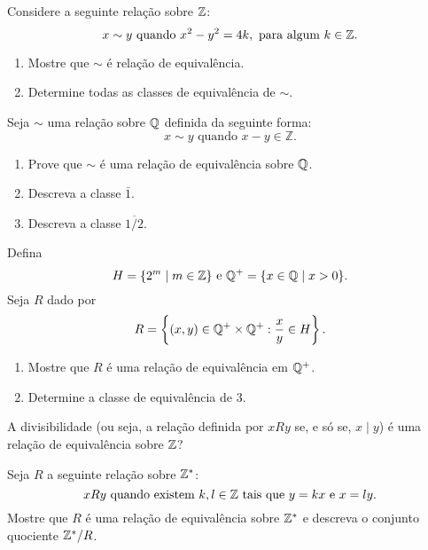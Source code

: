 \documentclass[12pt]{exam}
\begin{document}
\vspace{.3cm}

\questao Considere a seguinte rela\c{c}\~ao sobre $\mathbb{Z}$:
\[
    x \sim y \mbox{ quando }  x^2 - y^2 = 4k, \mbox{ para algum } k \in \mathbb{Z}.
\]
\begin{enumerate}[label={\alph*})]
    \item Mostre que $\sim$ {\'e} rela{\c c}{\~a}o de equival{\^e}ncia.
    \item Determine todas as classes de equival\^encia de $\sim$.
\end{enumerate}
\vspace{.3cm}

\questao Seja $\sim$ uma rela{\c c}{\~a}o sobre $\mathbb{Q}$ definida da seguinte forma:
\[
    x \sim y \mbox{ quando } x - y \in \mathbb{Z}.
\]
\begin{enumerate}[label={\alph*})]
    \item Prove que $\sim$ {\'e} uma rela{\c c}{\~a}o de equival{\^e}ncia sobre $\mathbb{Q}$.
    \item Descreva a classe $\bar{1}$.
    \item Descreva a classe $\overline{1/2}$.
\end{enumerate}

\vspace{.3cm}

\questao Defina
\[
    H = \{2^m \mid m \in \mathbb{Z}\} \mbox{ e } \mathbb{Q}^+ = \{x \in \mathbb{Q} \mid x > 0\}.
\]
Seja $R$ dado por
\[
    R = \left\{(x,y) \in \mathbb{Q}^+\times \mathbb{Q}^+ : \frac{x}{y} \in H\right\}.
\]
\begin{enumerate}[label={\alph*})]
    \item Mostre que $R$ \'e uma rela\c{c}\~ao de equival\^encia em $\mathbb{Q}^+$.
    \item Determine a classe de equival\^encia de $3$.
\end{enumerate}
\vspace{.3cm}

\questao A divisibilidade (ou seja, a rela{\c c}{\~a}o definida por $xRy$ se, e s{\'o}
se, $x \mid y$) {\'e} uma rela{\c c}{\~a}o de equival{\^e}ncia sobre $\mathbb{Z}$?

\vspace{.3cm}

\questao Seja $R$ a seguinte rela{\c c}{\~a}o sobre $\mathbb{Z}^*$:
\[
    x R y \mbox{ quando existem }  k, l \in \mathbb{Z} \mbox{ tais que } y = kx \mbox{ e } x = ly.
\]
Mostre que $R$ {\'e} uma rela{\c c}{\~a}o de equival{\^e}ncia sobre $\mathbb{Z}^*$ e
descreva o conjunto quociente $\mathbb{Z}^*/R$.
\end{document}
